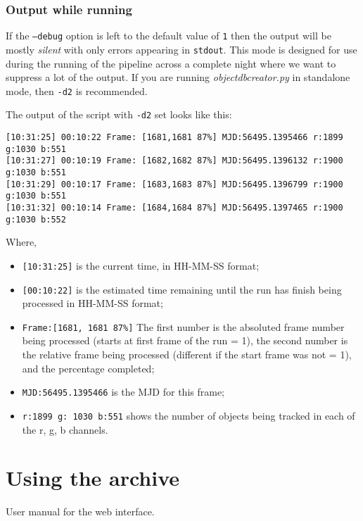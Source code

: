 \subsubsection{Output while running}
If the \texttt{--debug} option is left to the default value of \texttt{1} then the output will be mostly \emph{silent} with only errors appearing in \texttt{stdout}. This mode is designed for use during the running of the pipeline across a complete night where we want to suppress a lot of the output. If you are running \emph{objectdbcreator.py} in standalone mode, then \texttt{-d2} is recommended. 

The output of the script with \texttt{-d2} set looks like this:

\begin{lstlisting}
[10:31:25] 00:10:22 Frame: [1681,1681 87%] MJD:56495.1395466 r:1899 g:1030 b:551 
[10:31:27] 00:10:19 Frame: [1682,1682 87%] MJD:56495.1396132 r:1900 g:1030 b:551 
[10:31:29] 00:10:17 Frame: [1683,1683 87%] MJD:56495.1396799 r:1900 g:1030 b:551 
[10:31:32] 00:10:14 Frame: [1684,1684 87%] MJD:56495.1397465 r:1900 g:1030 b:552 
\end{lstlisting}

Where, 


\begin{itemize}
  \item \texttt{[10:31:25]} is the current time, in HH-MM-SS format;
  \item \texttt{[00:10:22]} is the estimated time remaining until the run has finish being processed in HH-MM-SS format;
  \item \texttt{Frame:[1681, 1681 87\%]} The first number is the absoluted frame number being processed (starts at first frame of the run = 1), the second number is the relative frame being processed (different if the start frame was not = 1), and the percentage completed;
  \item \texttt{MJD:56495.1395466} is the MJD for this frame;
  \item \texttt{r:1899 g: 1030 b:551} shows the number of objects being tracked in each of the r, g, b channels.
\end{itemize}


\section{Using the archive} 

User manual for the web interface.


